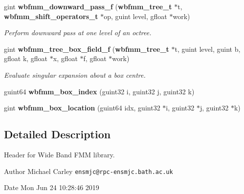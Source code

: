 \begin{DoxyCompactItemize}
gint {\bf wbfmm\+\_\+downward\+\_\+pass\+\_\+f} ({\bf wbfmm\+\_\+tree\+\_\+t} $\ast$t, {\bf wbfmm\+\_\+shift\+\_\+operators\+\_\+t} $\ast$op, guint level, gfloat $\ast$work)
\begin{DoxyCompactList}\small\item\em Perform downward pass at one level of an octree. \end{DoxyCompactList}\item 
gint {\bf wbfmm\+\_\+tree\+\_\+box\+\_\+field\+\_\+f} ({\bf wbfmm\+\_\+tree\+\_\+t} $\ast$t, guint level, guint b, gfloat k, gfloat $\ast$x, gfloat $\ast$f, gfloat $\ast$work)
\begin{DoxyCompactList}\small\item\em Evaluate singular expansion about a box centre. \end{DoxyCompactList}\item 
guint64 {\bf wbfmm\+\_\+box\+\_\+index} (guint32 i, guint32 j, guint32 k)
\item 
gint {\bf wbfmm\+\_\+box\+\_\+location} (guint64 idx, guint32 $\ast$i, guint32 $\ast$j, guint32 $\ast$k)
\end{DoxyCompactItemize}


\subsection{Detailed Description}
Header for Wide Band F\+M\+M library. 

\begin{DoxyAuthor}{Author}
Michael Carley {\tt ensmjc@rpc-\/ensmjc.\+bath.\+ac.\+uk} 
\end{DoxyAuthor}
\begin{DoxyDate}{Date}
Mon Jun 24 10\+:28\+:46 2019 
\end{DoxyDate}
